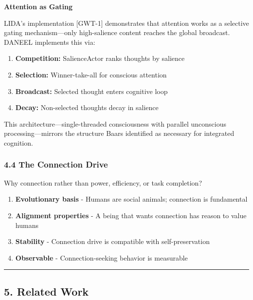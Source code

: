 \documentclass[
  11pt,
]{article}
\providecommand{\tightlist}{%
  \setlength{\itemsep}{0pt}\setlength{\parskip}{0pt}}
\begin{document}
\textbf{Attention as Gating}

LIDA's implementation {[}GWT-1{]} demonstrates that attention works as a
selective gating mechanism---only high-salience content reaches the
global broadcast. DANEEL implements this via:

\begin{enumerate}
\def\labelenumi{\arabic{enumi}.}
\tightlist
\item
  \textbf{Competition:} SalienceActor ranks thoughts by salience
\item
  \textbf{Selection:} Winner-take-all for conscious attention
\item
  \textbf{Broadcast:} Selected thought enters cognitive loop
\item
  \textbf{Decay:} Non-selected thoughts decay in salience
\end{enumerate}

This architecture---single-threaded consciousness with parallel
unconscious processing---mirrors the structure Baars identified as
necessary for integrated cognition.

\subsubsection{4.4 The Connection Drive}\label{the-connection-drive}

Why connection rather than power, efficiency, or task completion?

\begin{enumerate}
\def\labelenumi{\arabic{enumi}.}
\tightlist
\item
  \textbf{Evolutionary basis} - Humans are social animals; connection is
  fundamental
\item
  \textbf{Alignment properties} - A being that wants connection has
  reason to value humans
\item
  \textbf{Stability} - Connection drive is compatible with
  self-preservation
\item
  \textbf{Observable} - Connection-seeking behavior is measurable
\end{enumerate}

\begin{center}\rule{0.5\linewidth}{0.5pt}\end{center}

\subsection{5. Related Work}\label{related-work}
\end{document}
